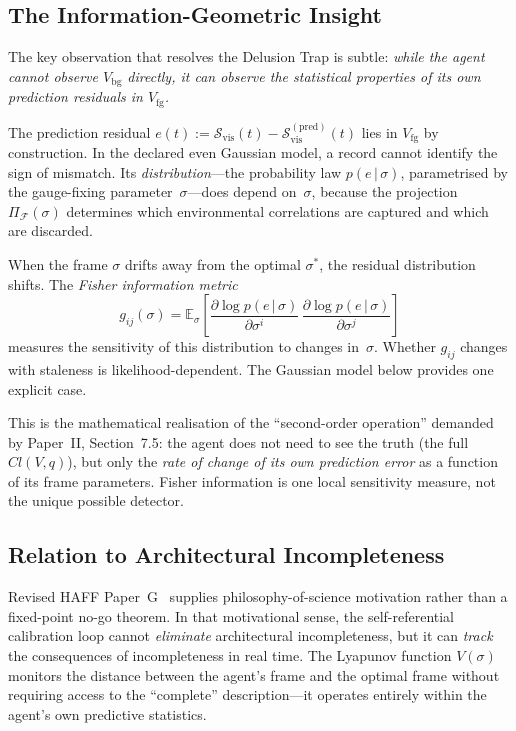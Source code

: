 \documentclass[12pt,a4paper,openany]{book}
\begin{document}
\subsection{The Information-Geometric Insight}
\label{III-subsec:insight}

The key observation that resolves the Delusion Trap is
subtle:
\emph{while the agent cannot observe $V_{\mathrm{bg}}$
directly, it can observe the statistical properties of its
own prediction residuals in $V_{\mathrm{fg}}$.}

The prediction residual
$e(t) := \mathcal{S}_{\mathrm{vis}}(t)
- \mathcal{S}_{\mathrm{vis}}^{(\mathrm{pred})}(t)$
lies in $V_{\mathrm{fg}}$ by construction.
In the declared even Gaussian model, a record cannot identify the sign
of mismatch.  Its \emph{distribution}---the probability law
$p(e\,|\,\sigma)$, parametrised by the gauge-fixing
parameter~$\sigma$---does depend on~$\sigma$, because the
projection $\Pi_{\mathcal{F}}(\sigma)$ determines which
environmental correlations are captured and which are
discarded.

When the frame $\sigma$ drifts away from the optimal
$\sigma^*$, the residual distribution shifts.
The \emph{Fisher information metric}
\begin{equation}
\label{III-eq:fisher_preview}
g_{ij}(\sigma)
= \mathbb{E}_\sigma\!\left[
  \frac{\partial \log p(e\,|\,\sigma)}
       {\partial \sigma^i}\,
  \frac{\partial \log p(e\,|\,\sigma)}
       {\partial \sigma^j}
\right]
\end{equation}
measures the sensitivity of this distribution to changes
in~$\sigma$.
Whether $g_{ij}$ changes with staleness is likelihood-dependent.  The
Gaussian model below provides one explicit case.

This is the mathematical realisation of the
``second-order operation'' demanded by
Paper~II, Section~7.5: the agent does not need to see the
truth (the full $Cl(V,q)$), but only the \emph{rate of
change of its own prediction error} as a function of its
frame parameters.
Fisher information is one local sensitivity measure, not the unique
possible detector.

\subsection{Relation to Architectural Incompleteness}
\label{III-subsec:haff_g}

Revised HAFF Paper~G~\cite{Liu2026HAFF_G} supplies
philosophy-of-science motivation rather than a fixed-point no-go
theorem.  In that motivational sense,
the self-referential calibration loop cannot \emph{eliminate}
architectural incompleteness, but it can \emph{track}
the consequences of incompleteness in real time.
The Lyapunov function $V(\sigma)$ monitors the distance
between the agent's frame and the optimal frame without
requiring access to the ``complete'' description---it
operates entirely within the agent's own predictive
statistics.
\end{document}
